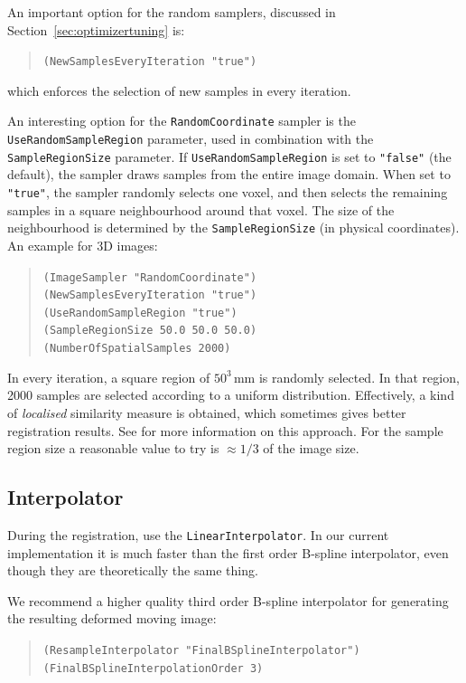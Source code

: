 \documentclass[]{report}
\begin{document}
An important option for the random samplers, discussed in
Section~\ref{sec:optimizertuning} is:
\begin{quote}
  \texttt{(NewSamplesEveryIteration "true")}
\end{quote}
which enforces the selection of new samples in every iteration.

An interesting option for the \texttt{RandomCoordinate} sampler is
the \texttt{UseRandomSampleRegion} parameter, used in combination
with the \texttt{SampleRegionSize} parameter. If
\texttt{UseRandomSampleRegion} is set to \texttt{"false"} (the
default), the sampler draws samples from the entire image domain.
When set to \texttt{"true"}, the sampler randomly selects one
voxel, and then selects the remaining samples in a square
neighbourhood around that voxel. The size of the neighbourhood is
determined by the \texttt{SampleRegionSize} (in physical
coordinates). An example for 3D images:
\begin{quote}
  \texttt{(ImageSampler "RandomCoordinate")}\\
  \texttt{(NewSamplesEveryIteration "true")}\\
  \texttt{(UseRandomSampleRegion "true")}\\
  \texttt{(SampleRegionSize 50.0 50.0 50.0)}\\
  \texttt{(NumberOfSpatialSamples 2000)}\\
\end{quote}
In every iteration, a square region of $50^3$\,mm is randomly selected. In that
region, 2000 samples are selected according to a uniform distribution.
Effectively, a kind of \emph{localised} similarity measure is obtained, which
sometimes gives better registration results. See \cite{Kle08:Automatic} for
more information on this approach. For the sample region size a reasonable
value to try is $\approx1/3$ of the image size.

\subsection{Interpolator}\label{sec:interpolatortuning}

During the registration, use the \texttt{LinearInterpolator}. In our
current implementation it is much faster than the first order
B-spline interpolator, even though they are theoretically the same
thing.

We recommend a higher quality third order B-spline interpolator for
generating the resulting deformed moving image:
\begin{quote}
\texttt{(ResampleInterpolator "FinalBSplineInterpolator")} \\
\texttt{(FinalBSplineInterpolationOrder 3)}
\end{quote}
\end{document}
